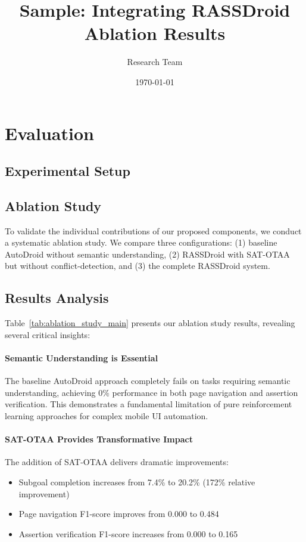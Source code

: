 \documentclass{article}
\title{Sample: Integrating RASSDroid Ablation Results}
\author{Research Team}
\date{\today}
\begin{document}
\maketitle


\section{Evaluation}

\subsection{Experimental Setup}

\subsection{Ablation Study}

To validate the individual contributions of our proposed components, we conduct a systematic ablation study. We compare three configurations: (1) baseline AutoDroid without semantic understanding, (2) RASSDroid with SAT-OTAA but without conflict-detection, and (3) the complete RASSDroid system.



\subsection{Results Analysis}

Table~\ref{tab:ablation_study_main} presents our ablation study results, revealing several critical insights:

\paragraph{Semantic Understanding is Essential} The baseline AutoDroid approach completely fails on tasks requiring semantic understanding, achieving 0\% performance in both page navigation and assertion verification. This demonstrates a fundamental limitation of pure reinforcement learning approaches for complex mobile UI automation.

\paragraph{SAT-OTAA Provides Transformative Impact} The addition of SAT-OTAA delivers dramatic improvements:
\begin{itemize}
    \item Subgoal completion increases from 7.4\% to 20.2\% (172\% relative improvement)
    \item Page navigation F1-score improves from 0.000 to 0.484
    \item Assertion verification F1-score increases from 0.000 to 0.165
\end{itemize}
\end{document}
